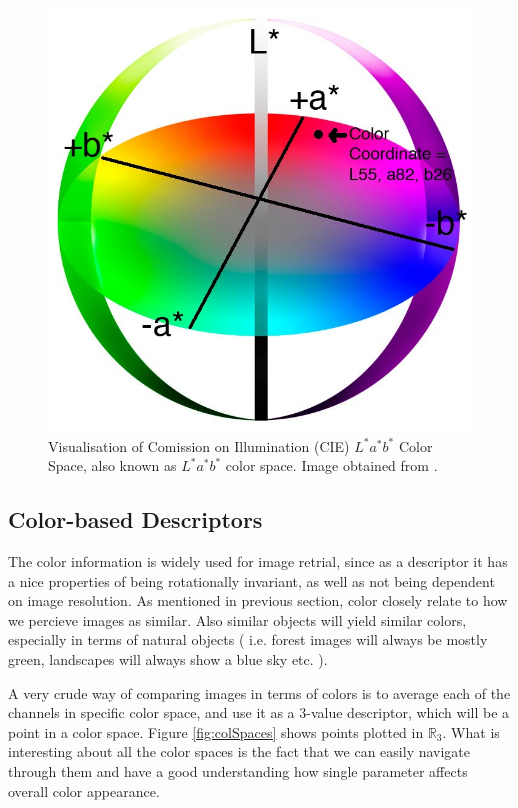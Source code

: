 \documentclass{report}
\begin{document}
\begin{figure}[hbtp]
 \centering
 \caption{Visualisation of Comission on Illumination (CIE) $L^*a^*b^*$ Color Space, also known as $L^*a^*b^*$ color space. Image obtained from \cite{lab_blogspot}.}
 \includegraphics[scale=0.17]{graphics/lab_space.jpg}
\end{figure}
 


\subsection{Color-based Descriptors}
The color information is widely used for image retrial, since as a descriptor it has a nice properties of being rotationally invariant, as well as not being dependent on image resolution. As mentioned in previous section, color closely relate to how we percieve images as similar. Also similar objects will yield similar colors, especially in terms of natural objects ( i.e. forest images will always be mostly green, landscapes will always show a blue sky etc. ). 

A very crude way of comparing images in terms of colors is to average each of the channels in specific color space, and use it as a $3$-value descriptor, which will be a point in a color space. Figure \ref{fig:colSpaces} shows points plotted in $\mathbb{R}_3$. What is interesting about all the color spaces is the fact that we can easily navigate through them and have a good understanding how single parameter affects overall color appearance.
\end{document}
